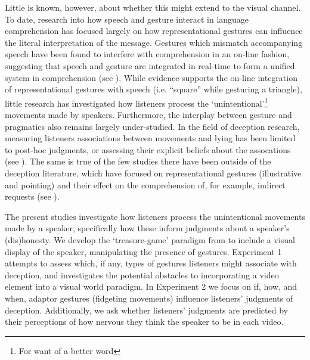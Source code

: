 \documentclass[a4paper,man,natbib]{apa6}
\begin{document}
Little is known, however, about whether this might extend to the visual channel.
To date, research into how speech and gesture interact in language comprehension has focused largely on how representational gestures can influence the literal interpretation of the message.
Gestures which mismatch accompanying speech have been found to interfere with comprehension in an on-line fashion, suggesting that speech and gesture are integrated in real-time to form a unified system in comprehension (see \citealt{Kelly2010, Habets2013}).
While evidence supports the on-line integration of representational gestures with speech (i.e. ``square'' while gesturing a triangle), little research has investigated how listeners process the `unintentional'\footnote{For want of a better word} movements made by speakers. 
Furthermore, the interplay between gesture and pragmatics also remains largely under-studied.
In the field of deception research, measuring listeners associations between movements and lying has been limited to post-hoc judgments, or assessing their explicit beliefs about the assocations (see \citealt{Vrij1996a, Zuckerman1981a}). 
The same is true of the few studies there have been outside of the deception literature, which have focused on representational gestures (illustrative and pointing) and their effect on the comprehension of, for example, indirect requests (see \citealt{Kelly1999}). 

The present studies investigate how listeners process the unintentional movements made by a speaker, specifically how these inform judgments about a speaker's (dis)honesty.
We develop the `treasure-game’ paradigm from \citet{Loy2017} to include a visual display of the speaker, manipulating the presence of gestures.
Experiment 1 attempts to assess which, if any, types of gestures listeners might associate with deception, and investigates the potential obstacles to incorporating a video element into a visual world paradigm.
In Experiment 2 we focus on if, how, and when, adaptor gestures (fidgeting movements) influence listeners' judgments of deception.
Additionally, we ask whether listeners' judgments are predicted by their perceptions of how nervous they think the speaker to be in each video.
\end{document}
